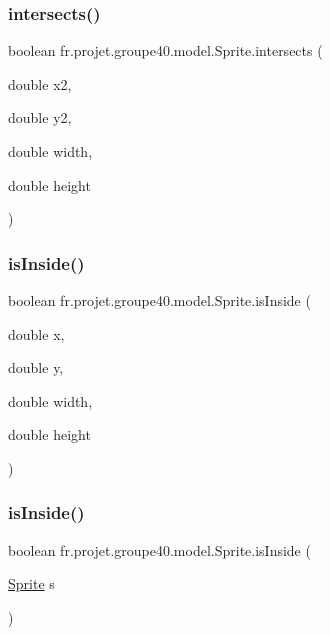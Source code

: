 \subsubsection{\texorpdfstring{intersects()}{intersects()}\hspace{0.1cm}{\footnotesize\ttfamily [2/2]}}
{\footnotesize\ttfamily boolean fr.\+projet.\+groupe40.\+model.\+Sprite.\+intersects (\begin{DoxyParamCaption}\item[{double}]{x2,  }\item[{double}]{y2,  }\item[{double}]{width,  }\item[{double}]{height }\end{DoxyParamCaption})}

\mbox{\label{classfr_1_1projet_1_1groupe40_1_1model_1_1_sprite_a03548b31b8fcd9b96713cbfa751ba8c5}} 
\subsubsection{\texorpdfstring{is\+Inside()}{isInside()}\hspace{0.1cm}{\footnotesize\ttfamily [1/2]}}
{\footnotesize\ttfamily boolean fr.\+projet.\+groupe40.\+model.\+Sprite.\+is\+Inside (\begin{DoxyParamCaption}\item[{double}]{x,  }\item[{double}]{y,  }\item[{double}]{width,  }\item[{double}]{height }\end{DoxyParamCaption})}

\mbox{\label{classfr_1_1projet_1_1groupe40_1_1model_1_1_sprite_a72a8e0699c8d320b462f1d2ab185484d}} 
\subsubsection{\texorpdfstring{is\+Inside()}{isInside()}\hspace{0.1cm}{\footnotesize\ttfamily [2/2]}}
{\footnotesize\ttfamily boolean fr.\+projet.\+groupe40.\+model.\+Sprite.\+is\+Inside (\begin{DoxyParamCaption}\item[{\hyperlink{classfr_1_1projet_1_1groupe40_1_1model_1_1_sprite}{Sprite}}]{s }\end{DoxyParamCaption})}


